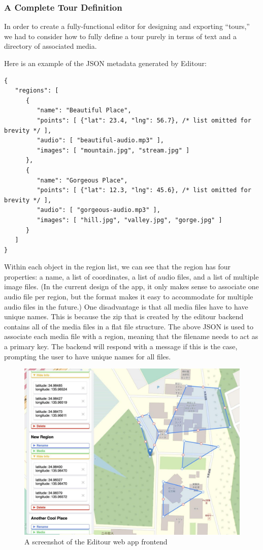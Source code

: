 \documentclass[a4paper, 10pt, american, titlepage]{article}
\begin{document}
\subsubsection{A Complete Tour Definition}
\label{sec:tourDefinition}

In order to create a fully-functional editor for designing and exporting
``tours,'' we had to consider how to fully define a tour purely in terms
of text and a directory of associated media.

Here is an example of the JSON metadata generated by Editour:

\begin{verbatim}
{
   "regions": [
      {
         "name": "Beautiful Place",
         "points": [ {"lat": 23.4, "lng": 56.7}, /* list omitted for brevity */ ],
         "audio": [ "beautiful-audio.mp3" ],
         "images": [ "mountain.jpg", "stream.jpg" ]
      },
      {
         "name": "Gorgeous Place",
         "points": [ {"lat": 12.3, "lng": 45.6}, /* list omitted for brevity */ ],
         "audio": [ "gorgeous-audio.mp3" ],
         "images": [ "hill.jpg", "valley.jpg", "gorge.jpg" ]
      }
   ]
}
\end{verbatim}

Within each object in the region list, we can see that the region has four
properties: a name, a list of coordinates, a list of audio files, and a list of
multiple image files. (In the current design of the app, it only makes sense to
associate one audio file per region, but the format makes it easy to
accommodate for multiple audio files in the future.) One disadvantage is that
all media files have to have unique names. This is because the zip that is
created by the editour backend contains all of the media files in a flat file
structure. The above JSON is used to associate each media file with a region,
meaning that the filename needs to act as a primary key. The backend will
respond with a message if this is the case, prompting the user to have unique
names for all files.

\begin{figure}[h]
	\centering
	\includegraphics[width=\textwidth]{editour.jpg}
	\caption{A screenshot of the Editour web app frontend}
	\label{fig:editour}
\end{figure}
\end{document}
